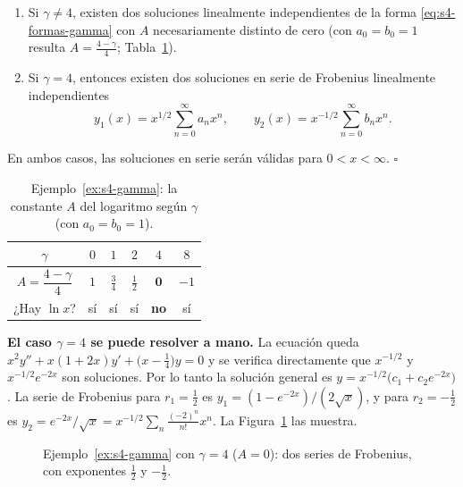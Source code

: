 \begin{example}
\begin{enumerate}
    \item Si $\gamma\neq4$, existen dos soluciones linealmente independientes de la forma \eqref{eq:s4-formas-gamma} con $A$ necesariamente distinto de cero (con $a_0=b_0=1$ resulta $A=\frac{4-\gamma}{4}$; Tabla~\ref{tab:s4-A}).
    \item Si $\gamma=4$, entonces existen dos soluciones en serie de Frobenius linealmente independientes
    \[ y_1(x) = x^{1/2} \sum_{n=0}^{\infty} a_n x^n, \qquad y_2(x) = x^{-1/2} \sum_{n=0}^{\infty} b_n x^n. \]
\end{enumerate}
En ambos casos, las soluciones en serie serán válidas para $0 < x < \infty$. \hfill $\square$
\end{example}
 
\begin{table}[H]
\centering
\small
\caption{Ejemplo~\ref{ex:s4-gamma}: la constante $A$ del logaritmo según $\gamma$ (con $a_0=b_0=1$).}
\label{tab:s4-A}
\begin{tabular}{|c|c|c|c|c|c|}
\hline
\rowcolor{bbe!15}$\gamma$ & $0$ & $1$ & $2$ & $4$ & $8$ \\ \hline
$A=\dfrac{4-\gamma}{4}$ & $1$ & $\frac34$ & $\frac12$ & $\mathbf{0}$ & $-1$ \\ \hline
¿Hay $\ln x$? & sí & sí & sí & \textbf{no} & sí \\ \hline
\end{tabular}
\end{table}
 
\begin{remark}
\textbf{El caso $\gamma=4$ se puede resolver a mano.} La ecuación queda $x^2y''+x(1+2x)y'+\bigl(x-\tfrac14\bigr)y=0$ y se verifica directamente que $x^{-1/2}$ y $x^{-1/2}e^{-2x}$ son soluciones. Por lo tanto la solución general es $y=x^{-1/2}\bigl(c_1+c_2e^{-2x}\bigr)$. La serie de Frobenius para $r_1=\tfrac12$ es $y_1=(1-e^{-2x})/(2\sqrt x)$, y para $r_2=-\tfrac12$ es $y_2=e^{-2x}/\sqrt x=x^{-1/2}\sum_{n}\frac{(-2)^n}{n!}x^n$. La Figura~\ref{fig:s4-gamma4} las muestra.
\end{remark}
 
\begin{figure}[H]
\centering
{}
\caption{Ejemplo~\ref{ex:s4-gamma} con $\gamma=4$ ($A=0$): dos series de Frobenius, con exponentes $\frac12$ y $-\frac12$.}
\label{fig:s4-gamma4}
\end{figure}
 
